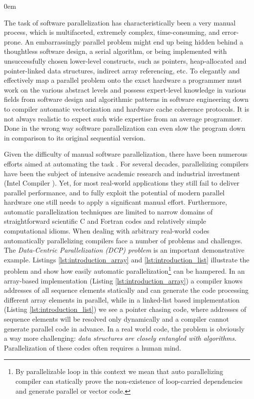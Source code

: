 \begin{description}[style=unboxed,leftmargin=0cm]
\itemsep0em
\item[\textit{Manual parallelization challenges}] The task of software parallelization has characteristically been a very manual process, which is multifaceted, extremely complex, time-consuming, and error-prone. An embarrassingly parallel problem might end up being hidden behind a thoughtless software design, a serial algorithm, or being implemented with unsuccessfully chosen lower-level constructs, such as pointers, heap-allocated and pointer-linked data structures, indirect array referencing, etc. To elegantly and effectively map a parallel problem onto the exact hardware a programmer must work on the various abstract levels and possess expert-level knowledge in various fields from software design and algorithmic patterns in software engineering down to compiler automatic vectorization and hardware cache coherence protocols. It is not always realistic to expect such wide expertise from an average programmer. Done in the wrong way software parallelization can even slow the program down in comparison to its original sequential version.
\item[\textit{Automatic parallelization limitations}] Given the difficulty of manual software parallelization, there have been numerous efforts aimed at automating the task \cite{Bacon:1994:CTH:197405.197406}. For several decades, parallelizing compilers have been the subject of intensive academic research \cite{6813266} and industrial investment (Intel Compiler \cite{icc-compiler}). Yet, for most real-world applications they still fail to deliver parallel performance, and to fully exploit the potential of modern parallel hardware one still needs to apply a significant manual effort. Furthermore, automatic parallelization techniques are limited to narrow domains of straightforward scientific C and Fortran codes and relatively simple computational idioms. When dealing with arbitrary real-world codes automatically parallelizing compilers face a number of problems and challenges. The \textit{Data-Centric Parallelization (DCP) problem} is an important demonstrative example. Listings \ref{lst:introduction_array} and \ref{lst:introduction_list} illustrate the problem and show how easily automatic parallelization\footnote{By parallelizable loop in this context we mean that auto parallelizing compiler can statically prove the non-existence of loop-carried dependencies and generate parallel or vector code.} can be hampered. In an array-based implementation (Listing \ref{lst:introduction_array}) a compiler knows addresses of all sequence elements statically and can generate the code processing different array elements in parallel, while in a linked-list based implementation (Listing \ref{lst:introduction_list}) we see a pointer chasing code, where addresses of sequence elements will be resolved only dynamically and a compiler cannot generate parallel code in advance. In a real world code, the problem is obviously a way more challenging: \textit{data structures are closely entangled with algorithms}. Parallelization of these codes often requires a human mind.\newline\null

\end{description}
